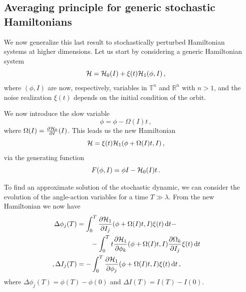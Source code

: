 \subsection{Averaging principle for generic stochastic Hamiltonians}

We now generalize this last result to stochastically perturbed Hamiltonian systems at higher dimensions. Let us start by considering a generic Hamiltonian system
\begin{equation}
	\mathcal{H} = \mathcal{H}_0(I) + \xi(t)\mathcal{H}_1(\phi, I)\,,
\end{equation}
where \((\phi, I)\) are now, respectively, variables in $\mathbb{T}^n$ and $\mathbb{R}^n$ with $n>1$, and the noise realization \(\xi(t)\) depends on the initial condition of the orbit.

We now introduce the slow variable
\begin{equation}
	\phi = \phi - \Omega(I)t\,,
\end{equation}
where \(\Omega(I) = \frac{\partial \mathcal{H}_0}{\partial I}(I)\). This leads us the new Hamiltonian
\begin{equation}
	\mathcal{H} = \xi(t)\mathcal{H}_1(\phi+\Omega(I)t,I)\,,
\end{equation}
via the generating function
\begin{equation}
	F(\phi,I) = \phi I - \mathcal{H}_0(I)t\,.
\end{equation}

To find an approximate solution of the stochastic dynamic, we can consider the evolution of the angle-action variables for a time \(T\gg \lambda\). From the new Hamiltonian we now have
\begin{equation}
	\begin{aligned}
		\Delta\phi_j(T) &= \int_0^T\pdv{\mathcal{H}_1}{I_j}\/(\phi+\Omega(I)t, I)\xi(t)\,\mathrm{d}t -\\
		&\qquad - \int_0^T t\pdv{\mathcal{H}_1}{\phi_k}\/(\phi + \Omega(I)t,I)\pdv{\Omega_k}{I_j}\xi(t)\,\mathrm{d}t\\ \,,
		\Delta I_j(T) &= -\int_0^T\pdv{\mathcal{H}_1}{\phi_j}\/(\phi+\Omega(I)t,I)\xi(t)\,\mathrm{d}t\,,
	\end{aligned}
	\label{eq:averaging-generic-hams}
\end{equation}
where \(\Delta \phi_j(T)=\phi(T)-\phi(0)\) and \(\Delta I(T)=I(T)-I(0)\).

